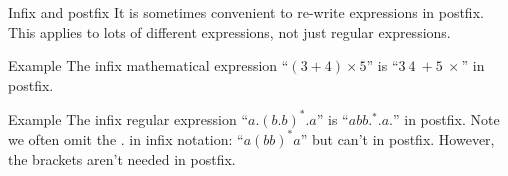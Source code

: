 \begin{frame}{Infix and postfix}
  It is sometimes convenient to re-write expressions in postfix.
  This applies to lots of different expressions, not just regular expressions.
  \vspace{2mm}
  \begin{exampleblock}{Example}
    The infix mathematical expression ``$(3+4) \times 5$'' is ``$3 \ 4 \ + 5 \ \times$'' in postfix.
  \end{exampleblock}
  \vspace{2mm}
  \begin{exampleblock}{Example}
    The infix regular expression ``$a.(b.b)^*.a$'' is ``$abb.^*.a.$'' in postfix.
    Note we often omit the $.$ in infix notation: ``$a(bb)^*a$'' but can't in postfix.
    However, the brackets aren't needed in postfix.
  \end{exampleblock}
\end{frame}
